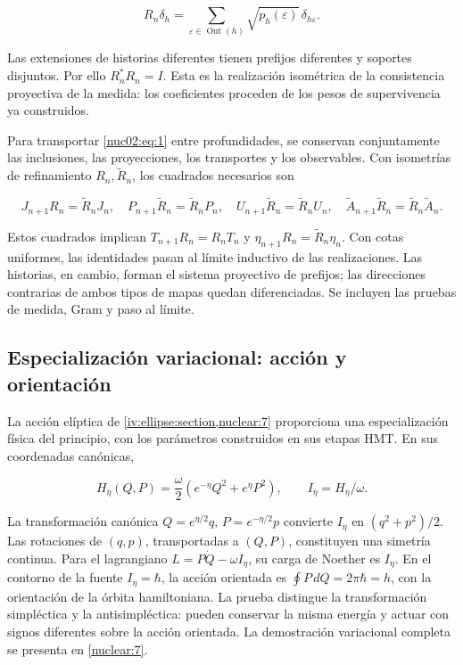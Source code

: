 \[
R_n\delta_h=\sum_{\varepsilon\in\operatorname{Out}(h)}
\sqrt{p_h(\varepsilon)}\,\delta_{h\varepsilon}.
\]

Las extensiones de historias diferentes tienen prefijos diferentes y soportes disjuntos. Por ello \(R_n^*R_n=I\). Esta es la realización isométrica de la consistencia proyectiva de la medida: los coeficientes proceden de los pesos de supervivencia ya construidos.

Para transportar \eqref{nuc02:eq:1} entre profundidades, se conservan conjuntamente las inclusiones, las proyecciones, los transportes y los observables. Con isometrías de refinamiento \(R_n,\widetilde R_n\), los cuadrados necesarios son

\[
J_{n+1}R_n=\widetilde R_nJ_n,\quad
P_{n+1}\widetilde R_n=\widetilde R_nP_n,\quad
U_{n+1}\widetilde R_n=\widetilde R_nU_n,\quad
\widetilde A_{n+1}\widetilde R_n=\widetilde R_n\widetilde A_n.
\]

Estos cuadrados implican \(T_{n+1}R_n=R_nT_n\) y \(\eta_{n+1}R_n=\widetilde R_n\eta_n\). Con cotas uniformes, las identidades pasan al límite inductivo de las realizaciones. Las historias, en cambio, forman el sistema proyectivo de prefijos; las direcciones contrarias de ambos tipos de mapas quedan diferenciadas. Se incluyen las pruebas de medida, Gram y paso al límite.

\subsection{Especialización variacional: acción y orientación}

La acción elíptica de \cref{iv:ellipse:section,nuclear:7} proporciona una especialización física del principio, con los parámetros construidos en sus etapas HMT. En sus coordenadas canónicas,

\[
H_\eta(Q,P)=\frac{\omega}{2}
\left(e^{-\eta}Q^2+e^\eta P^2\right),\qquad
I_\eta=H_\eta/\omega.
\]

La transformación canónica \(Q=e^{\eta/2}q\), \(P=e^{-\eta/2}p\) convierte \(I_\eta\) en \((q^2+p^2)/2\). Las rotaciones de \((q,p)\), transportadas a \((Q,P)\), constituyen una simetría continua. Para el lagrangiano \(L=P\dot Q-\omega I_\eta\), su carga de Noether es \(I_\eta\). En el contorno de la fuente \(I_\eta=\hbar\), la acción orientada es \(\oint P\,dQ=2\pi\hbar=h\), con la orientación de la órbita hamiltoniana. La prueba distingue la transformación simpléctica y la antisimpléctica: pueden conservar la misma energía y actuar con signos diferentes sobre la acción orientada. La demostración variacional completa se presenta en \cref{nuclear:7}.

